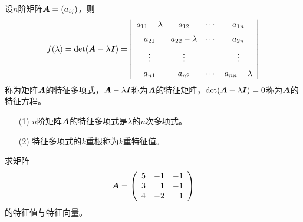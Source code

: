 \begin{frame}[fragile]\ft{\subsecname}  

  \begin{dingyi}
    设$n$阶矩阵$\boldsymbol{A}=(a_{ij})$，则
    $$
    f(\lambda)=\mathrm{det}(\boldsymbol{A}-\lambda\boldsymbol{I})
    =\left|
      \begin{array}{cccc}
                    a_{11}-\lambda&a_{12}&\cdots&a_{1n}\\[0.2cm]
                    a_{21}&a_{22}-\lambda&\cdots&a_{2n}\\[0.2cm]
                    \vdots&\vdots&&\vdots\\[0.2cm]
                    a_{n1}&a_{n2}&\cdots&a_{nn}-\lambda
                                                 \end{array}
                                                                                  \right|
                                                                                  $$
                                                                                  称为矩阵$\boldsymbol{A}$的特征多项式，$\boldsymbol{A}-\lambda\boldsymbol{I}$称为$\boldsymbol{A}$的特征矩阵，$\mathrm{det}(\boldsymbol{A}-\lambda\boldsymbol{I})=0$称为$\boldsymbol{A}$的特征方程。
                                                                                  \end{dingyi}

\end{frame}

\begin{frame}[fragile]\ft{\subsecname}  

  \begin{zhu*}
\begin{itemize}
                                                                                  \item[(1)]  $n$阶矩阵$\boldsymbol{A}$的特征多项式是$\lambda$的$n$次多项式。
                                                                                  \item[(2)]  特征多项式的$k$重根称为$k$重特征值。
                                                                                  \end{itemize}

  \end{zhu*}
\end{frame}

\begin{frame}[fragile]\ft{\subsecname}  
  \begin{li}
    求矩阵
    $$
    \boldsymbol{A}=\left(
      \begin{array}{rrr}
        5&-1&-1\\
        3&1&-1\\
        4&-2&1
      \end{array}
    \right)
    $$
    的特征值与特征向量。
  \end{li}
\end{frame}


